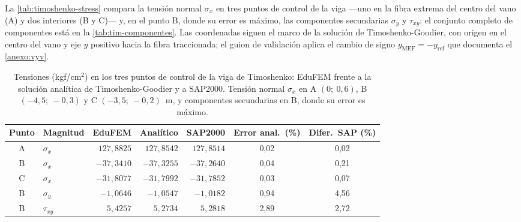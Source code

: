 La \autoref{tab:timoshenko-stress} compara la tensión normal $\sigma_x$ en tres puntos de control de la viga —uno en la fibra extrema del centro del vano (A) y dos interiores (B y C)— y, en el punto B, donde su error es máximo, las componentes secundarias $\sigma_y$ y $\tau_{xy}$; el conjunto completo de componentes está en la \autoref{tab:tim-componentes}. Las coordenadas siguen el marco de la solución de Timoshenko-Goodier, con origen en el centro del vano y eje $y$ positivo hacia la fibra traccionada; el guion de validación aplica el cambio de signo $y_{\text{MEF}} = -y_{\text{ref}}$ que documenta el \autoref{anexo:vyv}.

\begin{table}[htbp]
\centering
\caption[Tensiones (kgf/cm$^2$) en los puntos de control de la viga de Timoshenko: EduFEM frente a la solución analítica y a SAP2000.]{Tensiones (kgf/cm$^2$) en los tres puntos de control de la viga de Timoshenko: EduFEM frente a la solución analítica de Timoshenko-Goodier y a SAP2000. Tensión normal $\sigma_x$ en A $(0;\ 0{,}6)$, B $(-4{,}5;\ -0{,}3)$ y C $(-3{,}5;\ -0{,}2)$~m, y componentes secundarias en B, donde su error es máximo.}
\label{tab:timoshenko-stress}
\small
\setlength{\tabcolsep}{4pt}
\begin{tabular}{c l r r r c c}
\hline
Punto & Magnitud & EduFEM & Analítico & SAP2000 & Error anal.\ (\%) & Difer.\ SAP (\%) \\
\hline
A & $\sigma_x$   & $127{,}8825$ & $127{,}8542$ & $127{,}8514$ & 0,02 & 0,02 \\
B & $\sigma_x$   & $-37{,}3410$ & $-37{,}3255$ & $-37{,}2640$ & 0,04 & 0,21 \\
C & $\sigma_x$   & $-31{,}8077$ & $-31{,}7992$ & $-31{,}7852$ & 0,03 & 0,07 \\
B & $\sigma_y$   & $-1{,}0646$  & $-1{,}0547$  & $-1{,}0182$  & 0,94   & 4,56 \\
B & $\tau_{xy}$  & $5{,}4257$   & $5{,}2734$   & $5{,}2818$   & 2,89   & 2,72 \\
\hline
\end{tabular}
{\singlespacing{}}
\end{table}

